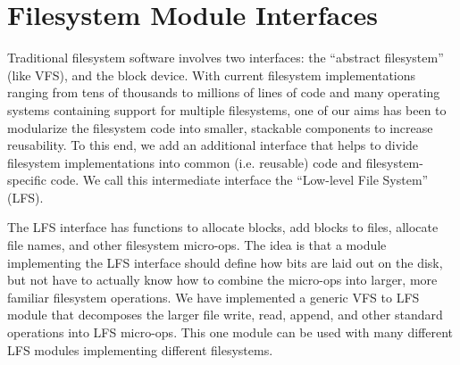 \preparagraphspacing{}
\section*{Filesystem Module Interfaces}
\label{sec:interfaces}

Traditional filesystem software involves two interfaces: the ``abstract
filesystem'' (like VFS), and the block device. With current filesystem
implementations ranging from tens of thousands to millions of lines of code
and many operating systems containing support for multiple filesystems, one of
our aims has been to modularize the filesystem code into smaller, stackable
components to increase reusability. To this end, we add an additional
interface that helps to divide filesystem implementations into common (i.e.
reusable) code and filesystem-specific code. We call this intermediate
interface the ``Low-level File System'' (LFS).

The LFS interface has functions to allocate blocks, add blocks to files,
allocate file names, and other filesystem micro-ops. The idea is that a module
implementing the LFS interface should define how bits are laid out on the
disk, but not have to actually know how to combine the micro-ops into larger,
more familiar filesystem operations. We have implemented a generic VFS to LFS
module that decomposes the larger file write, read, append, and other standard
operations into LFS micro-ops. This one module can be used with many different
LFS modules implementing different filesystems.
